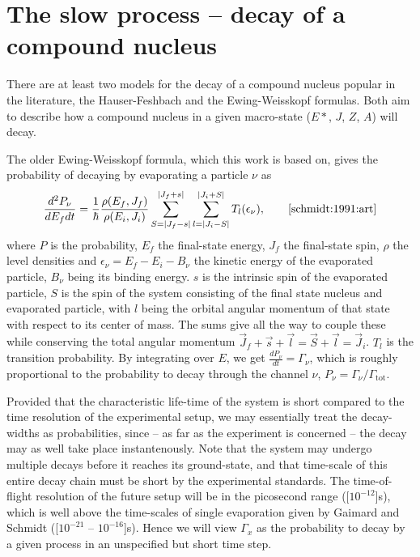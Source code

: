 \section{The slow process -- decay of a compound nucleus}
There are at least two models for the decay of a compound nucleus popular in the literature, the Hauser-Feshbach and the Ewing-Weisskopf formulas. Both aim to describe how a compound nucleus in a given macro-state ($E*$, $J$, $Z$, $A$) will decay.

The older Ewing-Weisskopf formula, which this work is based on, gives the probability of decaying by evaporating a particle $\nu$ as
\begin{equation}
\frac{d^2 P_\nu}{dE_f dt} = \frac{1}{\hbar} \frac{\rho(E_f,J_f)}{\rho(E_i,J_i)} \sum_{S=|J_f-s|}^{|J_f+s|}\sum_{l=|J_i-S|}^{|J_i+S|} T_l(\epsilon_\nu),\qquad\cite{schmidt:1991:art}\label{eq:ew}
\end{equation}
where $P$ is the probability, $E_f$ the final-state energy, $J_f$ the final-state spin, $\rho$ the level densities and $\epsilon_\nu = E_f-E_i-B_\nu$ the kinetic energy of the evaporated particle, $B_\nu$ being its binding energy. 
$s$ is the intrinsic spin of the evaporated particle, $S$ is the spin of the system consisting of the final state nucleus and evaporated particle, with $l$ being the orbital angular momentum of that state with respect to its center of mass. The sums give all the way to couple these while conserving the total angular momentum $\vec{J}_f+\vec{s} +\vec{l}= \vec{S} +\vec{l}= \vec{J}_i$. $T_l$ is the transition probability.
By integrating over $E$, we get $\frac{d P_\nu}{dt} = \Gamma_\nu$, which is roughly proportional to the probability to decay through the channel $\nu$, $P_\nu = \Gamma_\nu/\Gamma_{\text{tot}}$. 

Provided that the characteristic life-time of the system is short compared to the time resolution of the experimental setup, we may essentially treat the decay-widths as probabilities, since -- as far as the experiment is concerned -- the decay may as well take place instantenously. Note that the system may undergo multiple decays before it reaches its ground-state, and that time-scale of this entire decay chain must be short by the experimental standards. The time-of-flight resolution of the future \rtb{} setup will be in the picosecond range (\unit[$10^{-12}$]{s})\cite{r3b:online}, which is well above the time-scales of single evaporation given by Gaimard and Schmidt (\unit[$10^{-21}$ -- $10^{-16}$]{s})\cite{gaimard:1991:art}. Hence we will view $\Gamma_x$ as the probability to decay by a given process in an unspecified but short time step.

